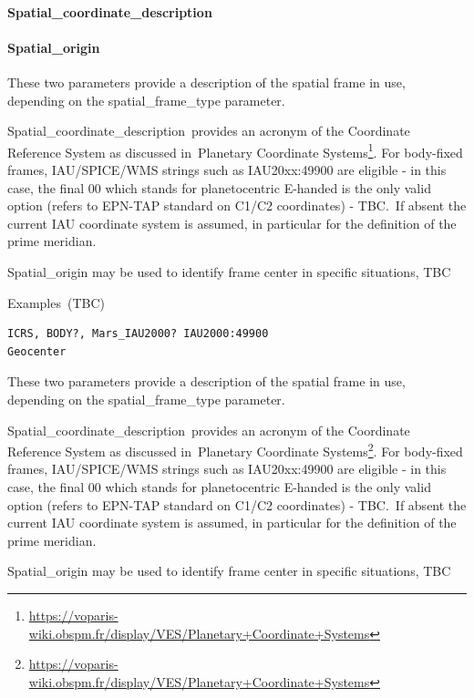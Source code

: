 \documentclass[11pt,a4paper]{ivoa}
\begin{document}
\paragraph{Spatial\_coordinate\_description}

\paragraph{Spatial\_origin}

These two parameters provide a description of the spatial frame in use, depending on the spatial\_frame\_type parameter. 

Spatial\_coordinate\_description provides an acronym of the Coordinate Reference System as discussed in Planetary Coordinate Systems\footnote{\url{https://voparis-wiki.obspm.fr/display/VES/Planetary+Coordinate+Systems}}. For body-fixed frames, IAU/SPICE/WMS strings such as IAU20xx:49900 are eligible - in this case, the final 00 which stands for planetocentric E-handed is the only valid option (refers to EPN-TAP standard on C1/C2 coordinates) - TBC. If absent the current IAU coordinate system is assumed, in particular for the definition of the prime meridian. 

Spatial\_origin may be used to identify frame center in specific situations, TBC

Examples (TBC)






\begin{verbatim}
ICRS, BODY?, Mars_IAU2000? IAU2000:49900
Geocenter
\end{verbatim}




These two parameters provide a description of the spatial frame in use, depending on the spatial\_frame\_type parameter. 

Spatial\_coordinate\_description provides an acronym of the Coordinate Reference System as discussed in Planetary Coordinate Systems\footnote{\url{https://voparis-wiki.obspm.fr/display/VES/Planetary+Coordinate+Systems}}. For body-fixed frames, IAU/SPICE/WMS strings such as IAU20xx:49900 are eligible - in this case, the final 00 which stands for planetocentric E-handed is the only valid option (refers to EPN-TAP standard on C1/C2 coordinates) - TBC. If absent the current IAU coordinate system is assumed, in particular for the definition of the prime meridian. 

Spatial\_origin may be used to identify frame center in specific situations, TBC
\end{document}

